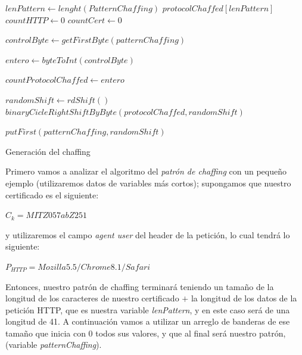 \documentclass[12pt, a4paper, titlepage]{report}
\begin{document}
            \newpage
            
            \begin{algorithm}[H]
                \SetAlgoLined
                
                $lenPattern \longleftarrow lenght(PatternChaffing)$\;
                $protocolChaffed[lenPattern]$
                $countHTTP \longleftarrow 0$\;
                $countCert \longleftarrow 0$\;
                
                $controlByte \longleftarrow getFirstByte(patternChaffing)$\;
                
                $entero \longleftarrow byteToInt(controlByte)$\;
                
                $countProtocolChaffed \longleftarrow entero$\;
                
                $randomShift \longleftarrow rdShift()$\;
                $binaryCicleRightShiftByByte(protocolChaffed, randomShift)$\;
                
                $putFirst(patternChaffing, randomShift)$\;
                
                \caption{Generación del chaffing}
            \end{algorithm}
		    
		   Primero vamos a analizar el algoritmo del \textit{patrón de chaffing} con un pequeño ejemplo (utilizaremos datos de variables más cortos); supongamos que nuestro certificado es el siguiente: 
		    \begin{center}
		        $C_k = MITZ057abZ251$
		    \end{center}
		    y utilizaremos el campo \textit{agent user} del header de la petición, lo cual tendrá lo siguiente:
		    \begin{center}
		        $P_{HTTP} = Mozilla5.5/Chrome8.1/Safari$
		    \end{center}
		    Entonces, nuestro patrón de chaffing terminará teniendo un tamaño de la longitud de los caracteres de nuestro certificado $+$ la longitud de los datos de la petición HTTP, que es nuestra variable \textit{lenPattern}, y en este caso será de una longitud de 41. A continuación vamos a utilizar un arreglo de banderas de ese tamaño que inicia con 0 todos sus valores, y que al final será nuestro patrón, (variable \textit{patternChaffing}).\\
		    
\end{document}

